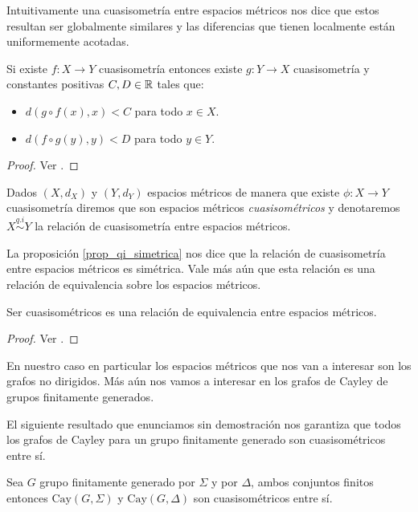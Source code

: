 \documentclass[tesis.tex]{subfiles}
\begin{document}
Intuitivamente una cuasisometría entre espacios métricos nos dice que estos resultan ser globalmente similares y las diferencias que tienen localmente están uniformemente acotadas. 

\medskip
\begin{prop}\label{prop_qi_simetrica}
	Si existe $f:X \to Y$ cuasisometría entonces existe $g:Y \to X$ cuasisometría 
	y constantes positivas $C,D \in \mathbb{R}$ tales que:
	\begin{itemize}
		\item $d(g \circ f (x), x) < C$ para todo $x \in X$.
		\item $d(f \circ g (y), y) < D$ para todo $y \in Y$. 
	\end{itemize}
\end{prop}
\begin{proof}
	Ver \cite{loh2017geometric}.
\end{proof}


\begin{deff}
	Dados $(X,d_{X})$ y $(Y,d_{Y})$ espacios métricos de manera que existe $\phi:X \to Y$ cuasisometría diremos que son espacios métricos \emph{cuasisométricos} y denotaremos $X \overset{q.i}{\sim} Y$ la relación de cuasisometría entre espacios métricos.
\end{deff}

La proposición \ref{prop_qi_simetrica} nos dice que la relación de cuasisometría entre espacios métricos es simétrica. 
Vale más aún que esta relación es una relación de equivalencia sobre los espacios métricos.

\begin{prop}
	Ser cuasisométricos es una relación de equivalencia entre espacios métricos.
\end{prop}
\begin{proof}
	Ver \cite{loh2017geometric}.
\end{proof}

En nuestro caso en particular los espacios métricos que nos van a interesar son los grafos no dirigidos.
Más aún nos vamos a interesar en los grafos de Cayley de grupos finitamente generados.

El siguiente resultado que enunciamos sin demostración nos garantiza que todos los grafos de Cayley para un grupo finitamente generado son cuasisométricos entre sí.
\begin{prop}
	Sea $G$ grupo finitamente generado por $\Sigma$ y por $\Delta$, ambos conjuntos finitos entonces $\text{Cay}(G,\Sigma)$ y $\text{Cay}(G, \Delta)$ son cuasisométricos entre sí.
\end{prop}
\end{document}
